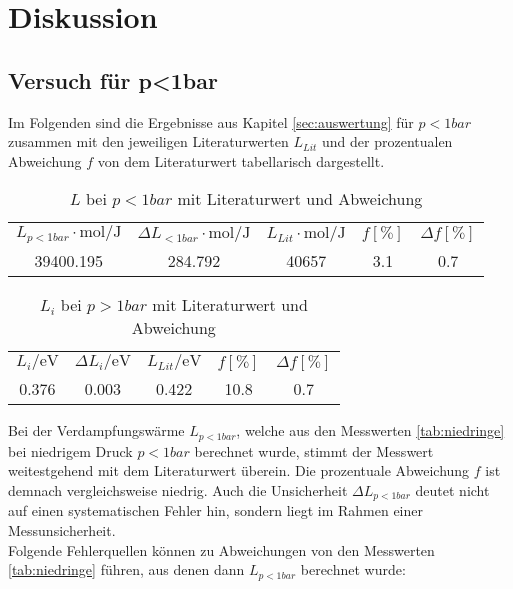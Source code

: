 \section{Diskussion}
\label{sec:Diskussion}
\subsection{Versuch für p<1bar}
Im Folgenden sind die Ergebnisse aus Kapitel \ref{sec:auswertung} für $p<1bar$ zusammen mit den jeweiligen Literaturwerten
$L_{Lit}$ und der prozentualen Abweichung $f$ von dem Literaturwert tabellarisch dargestellt.
\begin{table}[H]
  \centering
      \caption{$L$ bei $p<1bar$ mit Literaturwert\cite{AP02} und Abweichung}
      \begin{tabular}{S S S S S}
        \toprule
        {$ L_{p<1bar} \cdot \si{\mole\per\joule}$} & {$ \Delta L_{<1bar} \cdot \si{\mole\per\joule}$} & {$ L_{Lit} \cdot \si{\mole\per\joule}$} & {$f [\%]$} & {$\Delta f [\%]$}\\
        39400.195 & 284.792 & 40657 & 3.1 & 0.7\\
        \bottomrule
      \end{tabular}
    \end{table}
\begin{table}[H]
  \centering
      \caption{$L_{i}$ bei $p>1bar$ mit Literaturwert\cite{AP03} und Abweichung}
      \begin{tabular}{S S S S S}
        \toprule
        {$ L_{i} / \si{\electronvolt}$} & {$ \Delta L_{i} / \si{\electronvolt}$} & {$ L_{Lit} / \si{\electronvolt}$} & {$f [\%]$} & {$\Delta f [\%]$}\\
        0.376 & 0.003 & 0.422 & 10.8 & 0.7\\
        \bottomrule
      \end{tabular}
    \end{table}
\noindent
Bei der Verdampfungswärme $L_{p<1bar}$, welche aus den Messwerten \ref{tab:niedringe} bei niedrigem
Druck $p<1bar$ berechnet wurde, stimmt der Messwert weitestgehend mit dem Literaturwert überein. Die
prozentuale Abweichung $f$ ist demnach vergleichsweise niedrig. Auch die Unsicherheit
$\Delta L_{p<1bar}$ deutet nicht auf einen systematischen Fehler hin, sondern liegt im Rahmen einer
Messunsicherheit.\\
Folgende Fehlerquellen können zu Abweichungen von den Messwerten \ref{tab:niedringe} führen, aus denen
dann $L_{p<1bar}$ berechnet wurde:
